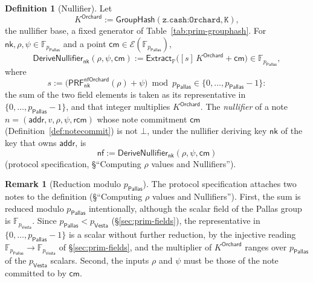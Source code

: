 \documentclass[11pt,a4paper]{article}
\theoremstyle{definition}
\newtheorem{definition}[theorem]{Definition}
\newtheorem{remark}[theorem]{Remark}
\newcommand{\F}{\mathbb{F}}
\newcommand{\PP}{\mathbb{P}}
\newcommand{\nfsym}{\mathsf{nf}}
\newcommand{\cmsym}{\mathsf{cm}}
\newcommand{\Pallas}{\ensuremath{\mathsf{Pallas}}}
\newcommand{\Vesta}{\ensuremath{\mathsf{Vesta}}}
\newcommand{\Ep}{\ensuremath{\mathcal{E}}}
\newcommand{\Extract}{\ensuremath{\mathsf{Extract}}}
\newcommand{\GroupHash}{\ensuremath{\mathsf{GroupHash}}}
\newcommand{\nksym}{\ensuremath{\mathsf{nk}}}
\newcommand{\rcm}{\ensuremath{\mathsf{rcm}}}
\begin{document}
\begin{definition}[Nullifier]\label{def:nullifier}
Let
\[
  K^{\mathsf{Orchard}} := \GroupHash(\texttt{z.cash:Orchard}, \texttt{K}),
\]
the nullifier base, a fixed generator of
Table~\ref{tab:prim-grouphash}. For $\nksym, \rho, \psi \in \F_{p_{\Pallas}}$
and a point $\cmsym \in \Ep(\F_{p_{\Pallas}})$,
\[
  \mathsf{DeriveNullifier}_{\nksym}(\rho, \psi, \cmsym) :=
    \Extract_{\PP}\bigl([s]\,K^{\mathsf{Orchard}} + \cmsym\bigr)
    \in \F_{p_{\Pallas}},
\]
where
\[
  s := \bigl(\mathsf{PRF}^{\mathsf{nfOrchard}}_{\nksym}(\rho) + \psi\bigr)
    \bmod p_{\Pallas} \in \{0, \dots, p_{\Pallas} - 1\}:
\]
the sum of the two field elements is taken as its representative in
$\{0, \dots, p_{\Pallas} - 1\}$, and that integer multiplies
$K^{\mathsf{Orchard}}$. The \emph{nullifier} of a note
$n = (\mathsf{addr}, v, \rho, \psi, \rcm)$ whose note commitment $\cmsym$
(Definition~\ref{def:notecommit}) is not $\bot$, under the nullifier
deriving key $\nksym$ of the key that owns $\mathsf{addr}$, is
\[
  \nfsym := \mathsf{DeriveNullifier}_{\nksym}(\rho, \psi, \cmsym)
\]
(protocol specification, \S``Computing $\rho$ values and Nullifiers'').
\end{definition}

\begin{remark}[Reduction modulo $p_{\Pallas}$]
The protocol specification attaches two notes to the definition
(\S``Computing $\rho$ values and Nullifiers''). First, the sum is reduced
modulo $p_{\Pallas}$ intentionally, although the scalar field of the Pallas
group is $\F_{p_{\Vesta}}$. Since $p_{\Pallas} < p_{\Vesta}$
(\S\ref{sec:prim-fields}), the representative in
$\{0, \dots, p_{\Pallas} - 1\}$ is a scalar without further reduction, by the
injective reading $\F_{p_{\Pallas}} \to \F_{p_{\Vesta}}$ of
\S\ref{sec:prim-fields}, and the multiplier of $K^{\mathsf{Orchard}}$ ranges
over $p_{\Pallas}$ of the $p_{\Vesta}$ scalars. Second, the inputs $\rho$ and
$\psi$ must be those of the note committed to by $\cmsym$.
\end{remark}
\end{document}

